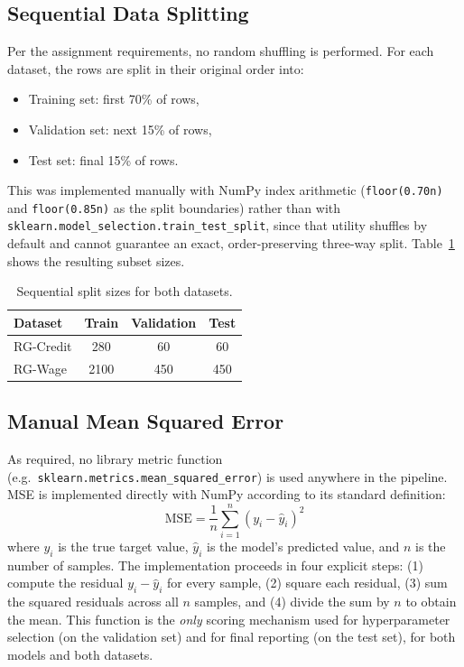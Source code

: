 \documentclass[11pt]{article}
\begin{document}
\subsection{Sequential Data Splitting}
Per the assignment requirements, no random shuffling is performed. For each dataset, the rows are split in their original order into:
\begin{itemize}
  \item Training set: first 70\% of rows,
  \item Validation set: next 15\% of rows,
  \item Test set: final 15\% of rows.
\end{itemize}
This was implemented manually with NumPy index arithmetic (\texttt{floor(0.70n)} and \texttt{floor(0.85n)} as the split boundaries) rather than with \texttt{sklearn.model\_selection.train\_test\_split}, since that utility shuffles by default and cannot guarantee an exact, order-preserving three-way split. Table~\ref{tab:splits} shows the resulting subset sizes.

\begin{table}[H]
\centering
\caption{Sequential split sizes for both datasets.}
\label{tab:splits}
\begin{tabular}{lccc}
\toprule
Dataset & Train & Validation & Test \\
\midrule
RG-Credit & 280 & 60 & 60 \\
RG-Wage & 2100 & 450 & 450 \\
\bottomrule
\end{tabular}
\end{table}

\subsection{Manual Mean Squared Error}
As required, no library metric function (e.g.\ \texttt{sklearn.metrics.mean\_squared\_error}) is used anywhere in the pipeline. MSE is implemented directly with NumPy according to its standard definition:
\begin{equation}
\text{MSE} = \frac{1}{n}\sum_{i=1}^{n}\left(y_i - \hat{y}_i\right)^2
\label{eq:mse}
\end{equation}
where $y_i$ is the true target value, $\hat{y}_i$ is the model's predicted value, and $n$ is the number of samples. The implementation proceeds in four explicit steps: (1) compute the residual $y_i - \hat{y}_i$ for every sample, (2) square each residual, (3) sum the squared residuals across all $n$ samples, and (4) divide the sum by $n$ to obtain the mean. This function is the \emph{only} scoring mechanism used for hyperparameter selection (on the validation set) and for final reporting (on the test set), for both models and both datasets.
\end{document}
